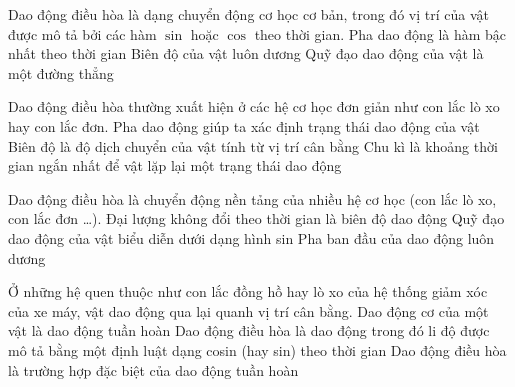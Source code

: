 \setcounter{ex}{0}
\PhanII
\begin{ex}
Dao động điều hòa là dạng chuyển động cơ học cơ bản, trong đó vị trí của vật được mô tả bởi các hàm $\sin$ hoặc $\cos$ theo thời gian.
{\True Pha dao động là hàm bậc nhất theo thời gian}
{\True Biên độ của vật luôn dương}
{Quỹ đạo dao động của vật là một đường thẳng}
\end{ex}
\begin{ex}
Dao động điều hòa thường xuất hiện ở các hệ cơ học đơn giản như con lắc lò xo hay con lắc đơn.
{\True Pha dao động giúp ta xác định trạng thái dao động của vật}
{Biên độ là độ dịch chuyển của vật tính từ vị trí cân bằng}
{\True Chu kì là khoảng thời gian ngắn nhất để vật lặp lại một trạng thái dao động}
\end{ex}
\begin{ex}
Dao động điều hòa là chuyển động nền tảng của nhiều hệ cơ học (con lắc lò xo, con lắc đơn …).
{\True Đại lượng không đổi theo thời gian là biên độ dao động}
{Quỹ đạo dao động của vật biểu diễn dưới dạng hình sin}
{Pha ban đầu của dao động luôn dương}
\loigiai{
\begin{itemchoice}
\itemch
\itemch
\itemch
\itemch
\end{itemchoice}
}
\end{ex}




\begin{ex}
Ở những hệ quen thuộc như con lắc đồng hồ hay lò xo của hệ thống giảm xóc của xe máy, vật dao động qua lại quanh vị trí cân bằng.
{Dao động cơ của một vật là dao động tuần hoàn}
{\True Dao động điều hòa là dao động trong đó li độ được mô tả bằng một định luật dạng cosin (hay sin) theo thời gian}
{\True Dao động điều hòa là trường hợp đặc biệt của dao động tuần hoàn}
\loigiai{
\begin{itemchoice}
\itemch
\itemch
\itemch
\itemch
\end{itemchoice}
}
\end{ex} 

